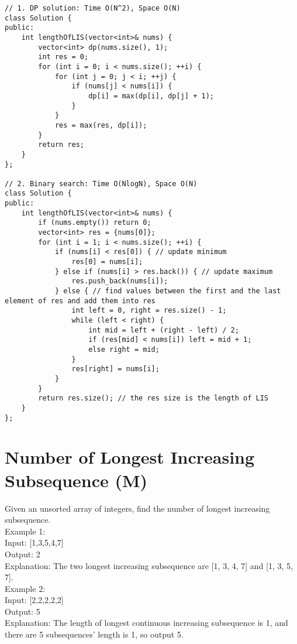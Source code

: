 \begin{lstlisting}
// 1. DP solution: Time O(N^2), Space O(N)
class Solution {
public:
    int lengthOfLIS(vector<int>& nums) {
        vector<int> dp(nums.size(), 1);
        int res = 0;
        for (int i = 0; i < nums.size(); ++i) {
            for (int j = 0; j < i; ++j) {
                if (nums[j] < nums[i]) {
                    dp[i] = max(dp[i], dp[j] + 1);
                }
            }
            res = max(res, dp[i]);
        }
        return res;
    }
};

// 2. Binary search: Time O(NlogN), Space O(N)
class Solution {
public:
    int lengthOfLIS(vector<int>& nums) {
        if (nums.empty()) return 0;
        vector<int> res = {nums[0]};
        for (int i = 1; i < nums.size(); ++i) {
            if (nums[i] < res[0]) { // update minimum
                res[0] = nums[i];
            } else if (nums[i] > res.back()) { // update maximum
                res.push_back(nums[i]);
            } else { // find values between the first and the last element of res and add them into res
                int left = 0, right = res.size() - 1;
                while (left < right) {
                    int mid = left + (right - left) / 2;
                    if (res[mid] < nums[i]) left = mid + 1;
                    else right = mid;
                }
                res[right] = nums[i];
            }
        }
        return res.size(); // the res size is the length of LIS
    }
};
\end{lstlisting}


\section{Number of Longest Increasing Subsequence (M)}
 Given an unsorted array of integers, find the number of longest increasing subsequence.\\

Example 1:\\

Input: [1,3,5,4,7]\\
Output: 2\\
Explanation: The two longest increasing subsequence are [1, 3, 4, 7] and [1, 3, 5, 7].\\

Example 2:\\

Input: [2,2,2,2,2]\\
Output: 5\\
Explanation: The length of longest continuous increasing subsequence is 1, and there are 5 subsequences' length is 1, so output 5.\\


